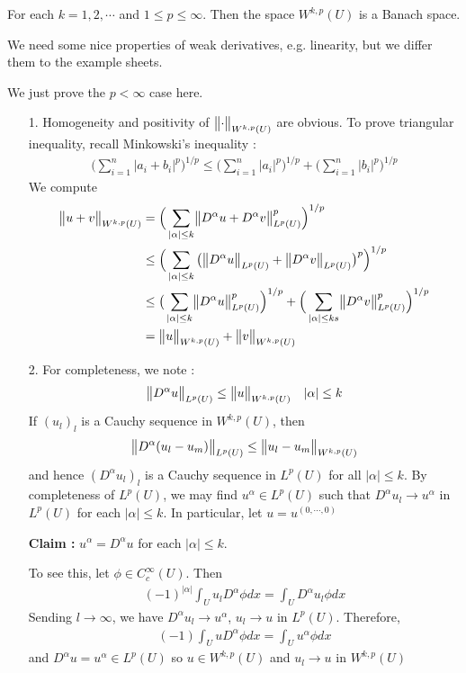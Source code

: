 \documentclass[12pt,a4paper]{report}
\newenvironment{proof}
{\begin{changemargin}{1cm}{0.5cm} 
	}%
	{\end{changemargin}
}
\newenvironment{subproof}
{\begin{changemargin}{0.5cm}{0.5cm} 
	}%
	{\end{changemargin}
}
\begin{document}
\thm  For each $k=1,2,\cdots$ and $1\leq p\leq \infty$. Then the space $W^{k,p}(U)$ is a Banach space.
\begin{proof}
We need some nice properties of weak derivatives, e.g. linearity, but we differ them to the example sheets.
\s

\pf We just prove the $p<\infty$ case here.
\begin{itemize}
\item[1.] Homogeneity and positivity of $\bigl\lVert\cdot\bigr\rVert_{W^{k,p}(U)}$ are obvious. To prove triangular inequality, recall Minkowski's inequality : 
\begin{align*}
\big( \sum_{i=1}^n |a_i + b_i|^p \big)^{1/p} \leq \big( \sum_{i=1}^n |a_i|^p \big)^{1/p} + \big( \sum_{i=1}^n |b_i|^p \big)^{1/p}
\end{align*}
We compute
\begin{align*}
\bigl\lVert u+v\bigr\rVert_{W^{k,p}(U)} &= \Big( \sum_{|\alpha| \leq k} \bigl\lVert D^{\alpha} u + D^{\alpha}v\bigr\rVert_{L^p (U)}^p \Big)^{1/p} \\
&\leq \Big( \sum_{|\alpha| \leq k} \big( \bigl\lVert D^{\alpha} u\bigr\rVert_{L^p (U)} + \bigl\lVert D^{\alpha} v\bigr\rVert_{L^p (U)} \big)^p \Big)^{1/p} \\
&\leq \big( \sum_{|\alpha| \leq k} \bigl\lVert D^{\alpha} u\bigr\rVert_{L^p (U)}^p \Big)^{1/p} + \Big( \sum_{|\alpha| \leq ks} \bigl\lVert D^{\alpha}v\bigr\rVert_{L^p (U)}^p \Big)^{1/p} \\
&= \bigl\lVert u\bigr\rVert_{W^{k,p}(U)} + \bigl\lVert v\bigr\rVert_{W^{k,p}(U)}
\end{align*}
\item[2.] For completeness, we note :
\begin{align*}
\bigl\lVert D^{\alpha} u\bigr\rVert_{L^p(U)} \leq \bigl\lVert u\bigr\rVert_{W^{k,p}(U)} \quad |\alpha| \leq k
\end{align*}
If $(u_l)_l$ is a Cauchy sequence in $W^{k,p}(U)$, then
\begin{align*}
\bigl\lVert D^{\alpha}(u_l - u_m)\bigr\rVert_{L^p(U)} \leq \bigl\lVert u_l -u_m\bigr\rVert_{W^{k,p}(U)}
\end{align*}
and hence $(D^{\alpha}u_l)_l$ is a Cauchy sequence in $L^p(U)$ for all $|\alpha| \leq k$. By completeness of $L^p (U)$, we may find $u^{\alpha} \in L^p(U)$ such that $D^{\alpha}u_l \rightarrow u^{\alpha}$ in $L^p(U)$ for each $|\alpha|\leq k$. In particular, let $u = u^{(0,\cdots, 0)}$
\begin{subproof}
\textbf{Claim : } $u^{\alpha} = D^{\alpha} u$ for each $|\alpha| \leq k$.

\pf To see this, let $\phi \in C^{\infty}_c(U)$. Then
\begin{align*}
(-1)^{|\alpha|} \int_U u_{l} D^{\alpha} \phi dx = \int_U D^{\alpha} u_l \phi dx
\end{align*}
Sending $l\rightarrow \infty$, we have $D^{\alpha} u_{l} \rightarrow u^{\alpha}$, $u_{l} \rightarrow u$ in $L^p(U)$. Therefore,
\begin{align*}
(-1) \int_U u D^{\alpha} \phi dx = \int_U u^{\alpha} \phi dx
\end{align*}
and $D^{\alpha} u = u^{\alpha} \in L^p(U)$ so $u\in W^{k,p}(U)$ and $u_l \rightarrow u$ in $W^{k,p}(U)$
\end{subproof}
\end{itemize}

\eop
\end{proof}
\s
\end{document}
